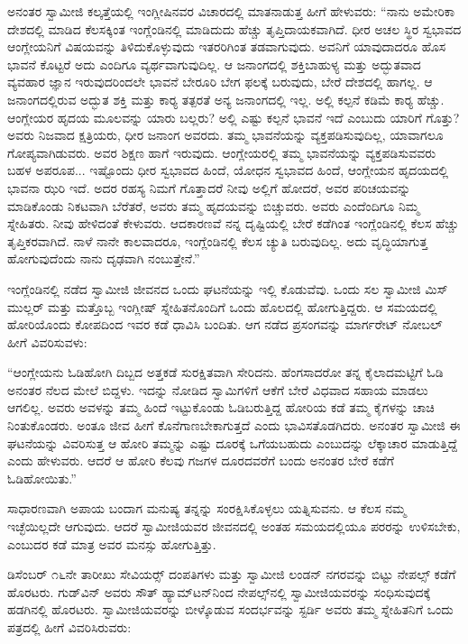  ಅನಂತರ ಸ್ವಾಮೀಜಿ ಕಲ್ಕತ್ತೆಯಲ್ಲಿ ಇಂಗ್ಲೀಷಿನವರ ವಿಚಾರದಲ್ಲಿ ಮಾತನಾಡುತ್ತ ಹೀಗೆ ಹೇಳುವರು: “ನಾನು ಅಮೇರಿಕಾ ದೇಶದಲ್ಲಿ ಮಾಡಿದ ಕೆಲಸಕ್ಕಿಂತ ಇಂಗ್ಲೆಂಡಿನಲ್ಲಿ ಮಾಡಿದುದು ಹೆಚ್ಚು ತೃಪ್ತಿದಾಯಕವಾಗಿದೆ. ಧೀರ ಅಚಲ ಸ್ಥಿರ ಸ್ವಭಾವದ ಆಂಗ್ಲೇಯನಿಗೆ ವಿಷಯವನ್ನು ತಿಳಿದುಕೊಳ್ಳುವುದು ಇತರರಿಗಿಂತ ತಡವಾಗುವುದು. ಅವನಿಗೆ ಯಾವುದಾದರೂ ಹೊಸ ಭಾವನೆ ಕೊಟ್ಟರೆ ಅದು ಎಂದಿಗೂ ವ್ಯರ್ಥವಾಗುವುದಿಲ್ಲ. ಆ ಜನಾಂಗದಲ್ಲಿ ಶಕ್ತಿಬಾಹುಳ್ಯ ಮತ್ತು ಅದ್ಭುತವಾದ ವ್ಯವಹಾರ ಜ್ಞಾನ ಇರುವುದರಿಂದಲೇ ಭಾವನೆ ಬೇರೂರಿ ಬೇಗ ಫಲಕ್ಕೆ ಬರುವುದು, ಬೇರೆ ದೇಶದಲ್ಲಿ ಹಾಗಲ್ಲ. ಆ ಜನಾಂಗದಲ್ಲಿರುವ ಅದ್ಭುತ ಶಕ್ತಿ ಮತ್ತು ಕಾರ‍್ಯ ತತ್ಪರತೆ ಅನ್ಯ ಜನಾಂಗದಲ್ಲಿ ಇಲ್ಲ. ಅಲ್ಲಿ ಕಲ್ಪನೆ ಕಡಿಮೆ ಕಾರ‍್ಯ ಹೆಚ್ಚು. ಆಂಗ್ಲೇಯರ ಹೃದಯ ಮೂಲವನ್ನು ಯಾರು ಬಲ್ಲರು? ಅಲ್ಲಿ ಎಷ್ಟು ಕಲ್ಪನೆ ಭಾವನೆ ಇದೆ ಎಂಬುದು ಯಾರಿಗೆ ಗೊತ್ತು? ಅವರು ನಿಜವಾದ ಕ್ಷತ್ರಿಯರು, ಧೀರ ಜನಾಂಗ ಅವರದು. ತಮ್ಮ ಭಾವನೆಯನ್ನು ವ್ಯಕ್ತಪಡಿಸುವುದಿಲ್ಲ, ಯಾವಾಗಲೂ ಗೋಪ್ಯವಾಗಿಡುವರು. ಅವರ ಶಿಕ್ಷಣ ಹಾಗೆ ಇರುವುದು. ಆಂಗ್ಲೇಯರಲ್ಲಿ ತಮ್ಮ ಭಾವನೆಯನ್ನು ವ್ಯಕ್ತಪಡಿಸುವವರು ಬಹಳ ಅಪರೂಪ... ಇಷ್ಟೊಂದು ಧೀರ ಸ್ವಭಾವದ ಹಿಂದೆ, ಯೋಧನ ಸ್ವಭಾವದ ಹಿಂದೆ, ಆಂಗ್ಲೇಯನ ಹೃದಯದಲ್ಲಿ ಭಾವನಾ ಝರಿ ಇದೆ. ಅದರ ರಹಸ್ಯ ನಿಮಗೆ ಗೊತ್ತಾದರೆ ನೀವು ಅಲ್ಲಿಗೆ ಹೋದರೆ, ಅವರ ಪರಿಚಯವನ್ನು ಮಾಡಿಕೊಂಡು ನಿಕಟವಾಗಿ ಬೆರೆತರೆ, ಅವರು ತಮ್ಮ ಹೃದಯವನ್ನು ಬಿಚ್ಚುವರು. ಅವರು ಎಂದೆಂದಿಗೂ ನಿಮ್ಮ ಸ್ನೇಹಿತರು. ನೀವು ಹೇಳಿದಂತೆ ಕೇಳುವರು. ಆದಕಾರಣವೆ ನನ್ನ ದೃಷ್ಟಿಯಲ್ಲಿ ಬೇರೆ ಕಡೆಗಿಂತ ಇಂಗ್ಲೆಂಡಿನಲ್ಲಿ ಕೆಲಸ ಹೆಚ್ಚು ತೃಪ್ತಿಕರವಾಗಿದೆ. ನಾಳೆ ನಾನೇ ಕಾಲವಾದರೂ, ಇಂಗ್ಲೆಂಡಿನಲ್ಲಿ ಕೆಲಸ ಚ್ಯುತಿ ಬರುವುದಿಲ್ಲ. ಅದು ವೃದ್ಧಿಯಾಗುತ್ತ ಹೋಗುವುದೆಂದು ನಾನು ದೃಢವಾಗಿ ನಂಬುತ್ತೇನೆ.” 

 ಇಂಗ್ಲೆಂಡಿನಲ್ಲಿ ನಡೆದ ಸ್ವಾಮೀಜಿ ಜೀವನದ ಒಂದು ಘಟನೆಯನ್ನು ಇಲ್ಲಿ ಕೊಡುವೆವು. ಒಂದು ಸಲ ಸ್ವಾಮೀಜಿ ಮಿಸ್ ಮುಲ್ಲರ್ ಮತ್ತು ಮತ್ತೊಬ್ಬ ಇಂಗ್ಲೀಷ್ ಸ್ನೇಹಿತನೊಂದಿಗೆ ಒಂದು ಹೊಲದಲ್ಲಿ ಹೋಗುತ್ತಿದ್ದರು. ಆ ಸಮಯದಲ್ಲಿ ಹೋರಿಯೊಂದು ಕೋಪದಿಂದ ಇವರ ಕಡೆ ಧಾವಿಸಿ ಬಂದಿತು. ಆಗ ನಡೆದ ಪ್ರಸಂಗವನ್ನು ಮಾರ್ಗರೇಟ್ ನೋಬಲ್ ಹೀಗೆ ವಿವರಿಸುವಳು: 

 “ಆಂಗ್ಲೇಯನು ಓಡಿಹೋಗಿ ದಿಬ್ಬದ ಅತ್ತಕಡೆ ಸುರಕ್ಷಿತವಾಗಿ ಸೇರಿದನು. ಹೆಂಗಸಾದರೋ ತನ್ನ ಕೈಲಾದಮಟ್ಟಿಗೆ ಓಡಿ ಅನಂತರ ನೆಲದ ಮೇಲೆ ಬಿದ್ದಳು. ಇದನ್ನು ನೋಡಿದ ಸ್ವಾಮಿಗಳಿಗೆ ಆಕೆಗೆ ಬೇರೆ ವಿಧವಾದ ಸಹಾಯ ಮಾಡಲು ಆಗಲಿಲ್ಲ. ಅವರು ಅವಳನ್ನು ತಮ್ಮ ಹಿಂದೆ ಇಟ್ಟುಕೊಂಡು ಓಡಿಬರುತ್ತಿದ್ದ ಹೋರಿಯ ಕಡೆ ತಮ್ಮ ಕೈಗಳನ್ನು ಚಾಚಿ ನಿಂತುಕೊಂಡರು. ಅಂತೂ ಜೀವ ಹೀಗೆ ಕೊನೆಗಾಣಬೇಕಾಗುತ್ತದೆ ಎಂದು ಭಾವಿಸತೊಡಗಿದರು. ಅನಂತರ ಸ್ವಾಮೀಜಿ ಈ ಘಟನೆಯನ್ನು ವಿವರಿಸುತ್ತ ಆ ಹೋರಿ ತಮ್ಮನ್ನು ಎಷ್ಟು ದೂರಕ್ಕೆ ಒಗೆಯಬಹುದು ಎಂಬುದನ್ನು ಲೆಕ್ಕಾಚಾರ ಮಾಡುತ್ತಿದ್ದೆ ಎಂದು ಹೇಳುವರು. ಆದರೆ ಆ ಹೋರಿ ಕೆಲವು ಗಜಗಳ ದೂರದವರೆಗೆ ಬಂದು ಅನಂತರ ಬೇರೆ ಕಡೆಗೆ ಓಡಿಹೋಯಿತು.” 

 ಸಾಧಾರಣವಾಗಿ ಅಪಾಯ ಬಂದಾಗ ಮನುಷ್ಯ ತನ್ನನ್ನು ಸಂರಕ್ಷಿಸಿಕೊಳ್ಳಲು ಯತ್ನಿಸುವನು. ಆ ಕೆಲಸ ನಮ್ಮ ಇಚ್ಛೆಯಿಲ್ಲದೇ ಆಗುವುದು. ಆದರೆ ಸ್ವಾಮೀಜಿಯವರ ಜೀವನದಲ್ಲಿ ಅಂತಹ ಸಮಯದಲ್ಲಿಯೂ ಪರರನ್ನು ಉಳಿಸಬೇಕು, ಎಂಬುದರ ಕಡೆ ಮಾತ್ರ ಅವರ ಮನಸ್ಸು ಹೋಗುತ್ತಿತ್ತು. 

 ಡಿಸೆಂಬರ್ ೧೬ನೇ ತಾರೀಖು ಸೇವಿಯರ್ಸ್‍‍ ದಂಪತಿಗಳು ಮತ್ತು ಸ್ವಾಮೀಜಿ ಲಂಡನ್ ನಗರವನ್ನು ಬಿಟ್ಟು ನೇಪಲ್ಸ್ ಕಡೆಗೆ ಹೊರಟರು. ಗುಡ್‌ವಿನ್ ಅವರು ಸೌತ್ ಹ್ಯಾಮ್‌ಟನ್‌ನಿಂದ ನೇಪಲ್ಸ್‌ನಲ್ಲಿ ಸ್ವಾಮೀಜಿಯವರನ್ನು ಸಂಧಿಸುವುದಕ್ಕೆ ಹಡಗಿನಲ್ಲಿ ಹೊರಟರು. ಸ್ವಾಮೀಜಿಯವರನ್ನು ಬೀಳ್ಕೊಡುವ ಸಂದರ್ಭವನ್ನು ಸ್ಟರ್ಡಿ ಅವರು ತಮ್ಮ ಸ್ನೇಹಿತನಿಗೆ ಒಂದು ಪತ್ರದಲ್ಲಿ ಹೀಗೆ ವಿವರಿಸಿರುವರು:

